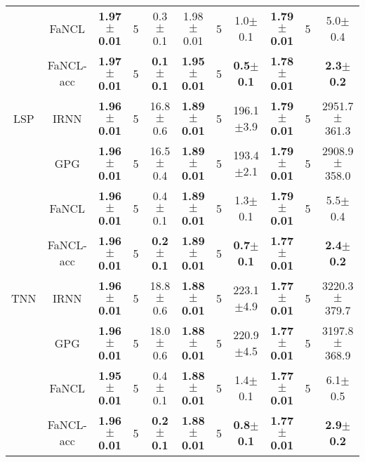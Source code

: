 \documentclass[10pt,journal,compsoc]{IEEEtran}
\begin{document}
\begin{table*}[ht]
\begin{tabular}{cc|ccc|ccc|ccc}
		&   \textsf{FaNCL}    & \textbf{1.97$\pm$0.01} &  5   &     0.3$\pm$0.1      &     1.98$\pm$0.01      &  5   &     1.0$\pm$0.1      & \textbf{1.79$\pm$0.01} &  5   &     5.0$\pm$0.4      \\ \cline{2-11}
		& \textsf{FaNCL-acc}  & \textbf{1.97$\pm$0.01} &  5   & \textbf{0.1$\pm$0.1} & \textbf{1.95$\pm$0.01} &  5   & \textbf{0.5$\pm$0.1} & \textbf{1.78$\pm$0.01} &      & \textbf{2.3$\pm$0.2} \\ \hline
		LSP       &    \textsf{IRNN}    & \textbf{1.96$\pm$0.01} &  5   &     16.8$\pm$0.6     & \textbf{1.89$\pm$0.01} &  5   &    196.1$\pm$3.9     & \textbf{1.79$\pm$0.01} &  5   &   2951.7$\pm$361.3   \\ \cline{2-11}
		&    \textsf{GPG}     & \textbf{1.96$\pm$0.01} &  5   &     16.5$\pm$0.4     & \textbf{1.89$\pm$0.01} &  5   &    193.4$\pm$2.1     & \textbf{1.79$\pm$0.01} &  5   &   2908.9$\pm$358.0   \\ \cline{2-11}
		&   \textsf{FaNCL}    & \textbf{1.96$\pm$0.01} &  5   &     0.4$\pm$0.1      & \textbf{1.89$\pm$0.01} &  5   &     1.3$\pm$0.1      & \textbf{1.79$\pm$0.01} &  5   &     5.5$\pm$0.4      \\ \cline{2-11}
		& \textsf{FaNCL-acc}  & \textbf{1.96$\pm$0.01} &  5   & \textbf{0.2$\pm$0.1} & \textbf{1.89$\pm$0.01} &  5   & \textbf{0.7$\pm$0.1} & \textbf{1.77$\pm$0.01} &      & \textbf{2.4$\pm$0.2} \\ \hline
		TNN       &    \textsf{IRNN}    & \textbf{1.96$\pm$0.01} &  5   &     18.8$\pm$0.6     & \textbf{1.88$\pm$0.01} &  5   &    223.1$\pm$4.9     & \textbf{1.77$\pm$0.01} &  5   &   3220.3$\pm$379.7   \\ \cline{2-11}
		&    \textsf{GPG}     & \textbf{1.96$\pm$0.01} &  5   &     18.0$\pm$0.6     & \textbf{1.88$\pm$0.01} &  5   &    220.9$\pm$4.5     & \textbf{1.77$\pm$0.01} &  5   &   3197.8$\pm$368.9   \\ \cline{2-11}
		&   \textsf{FaNCL}    & \textbf{1.95$\pm$0.01} &  5   &     0.4$\pm$0.1      & \textbf{1.88$\pm$0.01} &  5   &     1.4$\pm$0.1      & \textbf{1.77$\pm$0.01} &  5   &     6.1$\pm$0.5      \\ \cline{2-11}
		& \textsf{FaNCL-acc}  & \textbf{1.96$\pm$0.01} &  5   & \textbf{0.2$\pm$0.1} & \textbf{1.88$\pm$0.01} &  5   & \textbf{0.8$\pm$0.1} & \textbf{1.77$\pm$0.01} &      & \textbf{2.9$\pm$0.2} \\ \hline
	\end{tabular}
	\label{tab:sythmatcomp}
\end{table*}
\end{document}
